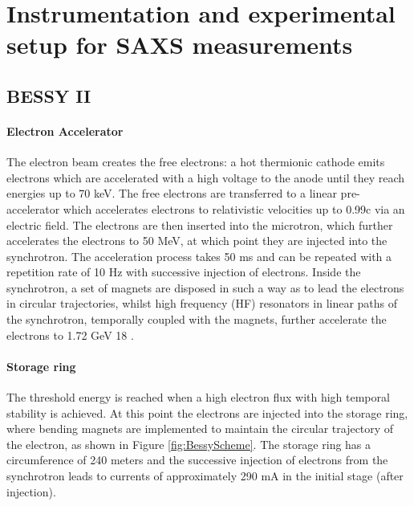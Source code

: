 \chapter{Instrumentation and experimental setup for SAXS measurements}
\label{chap:experimental_setup}

\section{BESSY II}

\subsubsection{Electron Accelerator}

The electron beam creates the free electrons: a hot thermionic cathode emits electrons which are accelerated with a high voltage to the anode until they reach energies up to 70 keV. The free electrons are transferred to a linear pre-accelerator which accelerates electrons to relativistic velocities up to 0.99c via an electric field. The electrons are then inserted into the microtron, which further accelerates the electrons to 50 MeV, at which point they are injected into the synchrotron. The acceleration process takes 50 ms and can be repeated with a repetition rate of 10 Hz with successive injection of electrons. Inside the synchrotron, a set of magnets are disposed in such a way as to lead the electrons in circular trajectories, whilst high frequency (HF) resonators in linear paths of the synchrotron, temporally coupled with the magnets, further accelerate the electrons to 1.72 GeV 18 .

\subsubsection{Storage ring}

The threshold energy is reached when a high electron flux with high temporal stability is achieved. At this point the electrons are injected into the storage ring, where bending magnets are implemented to maintain the circular trajectory of the electron, as shown in Figure \ref{fig:BessyScheme}. The storage ring has a circumference of 240 meters and the successive injection of electrons from the synchrotron leads to currents of approximately 290 mA in the initial stage (after injection).

